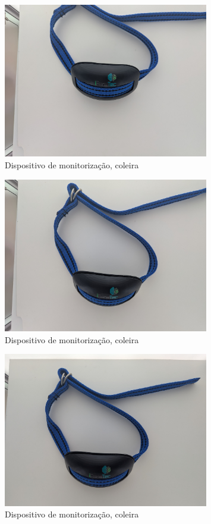\begin{figure}[h!]
	\centering
    \includegraphics[width=0.8\textwidth]{figs/col2.jpg}
    \caption{Dispositivo de monitorização, coleira}
    \label{fig:col2}
\end{figure}

\begin{figure}[h!]
	\centering
    \includegraphics[width=0.8\textwidth]{figs/col3.jpg}
    \caption{Dispositivo de monitorização, coleira}
    \label{fig:col4}
\end{figure}

\begin{figure}[h!]
	\centering
    \includegraphics[width=0.8\textwidth]{figs/col5.jpg}
    \caption{Dispositivo de monitorização, coleira}
    \label{fig:col5}
\end{figure}